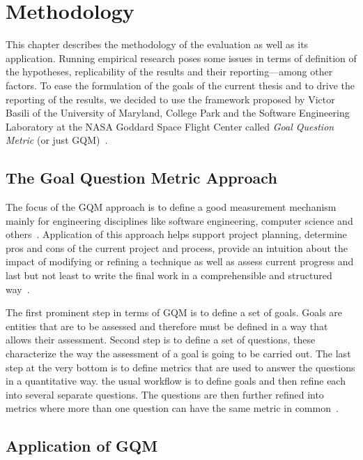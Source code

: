 \chapter{Methodology}
\label{chapter:methodology}

This chapter describes the methodology of the evaluation as well as its application. Running empirical research poses some issues in terms of definition of the hypotheses, replicability of the results and their reporting---among other factors. To ease the formulation of the goals of the current thesis and to drive the reporting of the results, we decided to use the framework proposed by Victor Basili of the University of Maryland, College Park and the Software Engineering Laboratory at the NASA Goddard Space Flight Center called \textit{Goal Question Metric} (or just GQM)~\cite{basili1992software}.

\section{The Goal Question Metric Approach}

The focus of the GQM approach is to define a good measurement mechanism mainly for engineering disciplines like software engineering, computer science and others~\cite{basili1992software}. Application of this approach helps support project planning, determine pros and cons of the current project and process, provide an intuition about the impact of modifying or refining a technique as well as assess current progress and last but not least to write the final work in a comprehensible and structured way~\cite{basili1992software}.

The first prominent step in terms of GQM is to define a set of goals. Goals are entities that are to be assessed and therefore must be defined in a way that allows their assessment. Second step is to define a set of questions, these characterize the way the assessment of a goal is going to be carried out. The last step at the very bottom is to define metrics that are used to answer the questions in a quantitative way. the usual workflow is to define goals and then refine each into several separate questions. The questions are then further refined into metrics where more than one question can have the same metric in common~\cite{basili1992software}.

\section{Application of GQM}

